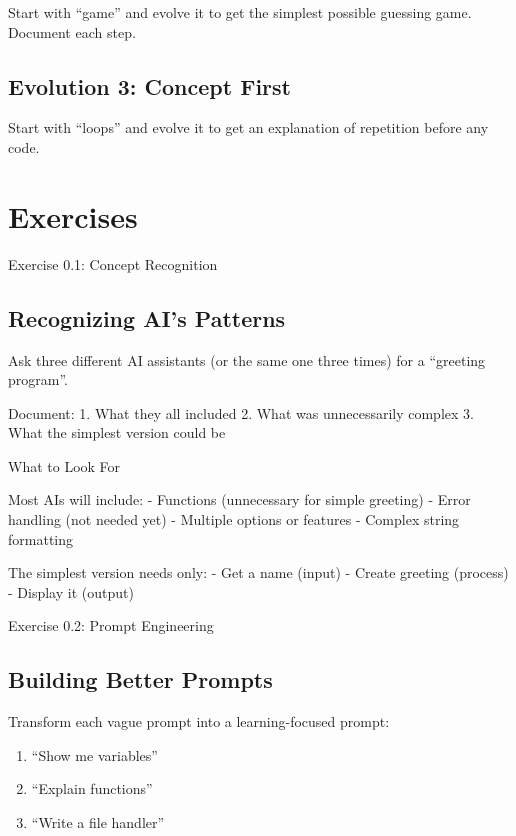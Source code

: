 \documentclass[
  letterpaper,
  DIV=11,
  numbers=noendperiod,
  oneside]{scrreprt}
\providecommand{\tightlist}{%
  \setlength{\itemsep}{0pt}\setlength{\parskip}{0pt}}\usepackage{longtable,booktabs,array}
\begin{document}
Start with ``game'' and evolve it to get the simplest possible guessing
game. Document each step.

\subsection{Evolution 3: Concept First}\label{evolution-3-concept-first}

Start with ``loops'' and evolve it to get an explanation of repetition
before any code.

\section{Exercises}\label{exercises}

Exercise 0.1: Concept Recognition

\subsection{Recognizing AI's Patterns}\label{recognizing-ais-patterns}

Ask three different AI assistants (or the same one three times) for a
``greeting program''.

Document: 1. What they all included 2. What was unnecessarily complex 3.
What the simplest version could be

What to Look For

Most AIs will include: - Functions (unnecessary for simple greeting) -
Error handling (not needed yet) - Multiple options or features - Complex
string formatting

The simplest version needs only: - Get a name (input) - Create greeting
(process) - Display it (output)

Exercise 0.2: Prompt Engineering

\subsection{Building Better Prompts}\label{building-better-prompts}

Transform each vague prompt into a learning-focused prompt:

\begin{enumerate}
\def\labelenumi{\arabic{enumi}.}
\tightlist
\item
  ``Show me variables''
\item
  ``Explain functions''
\item
  ``Write a file handler''
\end{enumerate}
\end{document}
